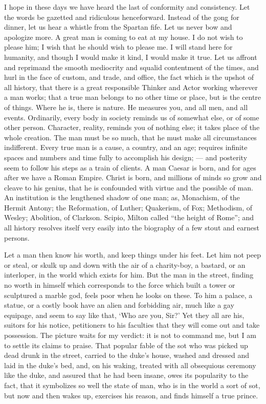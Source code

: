 \documentclass[12pt]{article}
\begin{document}
I hope in these days we have heard the last of conformity and consistency.
Let the words be gazetted and ridiculous henceforward. Instead of the gong
for dinner, let us hear a whistle from the Spartan fife. Let us never bow
and apologize more. A great man is coming to eat at my house. I do not wish
to please him; I wish that he should wish to please me. I will stand here
for humanity, and though I would make it kind, I would make it true. Let us
affront and reprimand the smooth mediocrity and squalid contentment of the
times, and hurl in the face of custom, and trade, and office, the fact which
is the upshot of all history, that there is a great responsible Thinker and
Actor working wherever a man works; that a true man belongs to no other time
or place, but is the centre of things. Where he is, there is nature. He
measures you, and all men, and all events. Ordinarily, every body in society
reminds us of somewhat else, or of some other person. Character, reality,
reminds you of nothing else; it takes place of the whole creation. The man
must be so much, that he must make all circumstances indifferent. Every true
man is a cause, a country, and an age; requires infinite spaces and numbers
and time fully to accomplish his design; --- and posterity seem to follow his
steps as a train of clients. A man Caesar is born, and for ages after we
have a Roman Empire. Christ is born, and millions of minds so grow and
cleave to his genius, that he is confounded with virtue and the possible of
man. An institution is the lengthened shadow of one man; as, Monachism, of
the Hermit Antony; the Reformation, of Luther; Quakerism, of Fox; Methodism,
of Wesley; Abolition, of Clarkson. Scipio, Milton called ``the height of
Rome''; and all history resolves itself very easily into the biography of a
few stout and earnest persons.

Let a man then know his worth, and keep things under his feet. Let him not
peep or steal, or skulk up and down with the air of a charity-boy, a
bastard, or an interloper, in the world which exists for him. But the man in
the street, finding no worth in himself which corresponds to the force which
built a tower or sculptured a marble god, feels poor when he looks on these.
To him a palace, a statue, or a costly book have an alien and forbidding
air, much like a gay equipage, and seem to say like that, `Who are you,
Sir?' Yet they all are his, suitors for his notice, petitioners to his
faculties that they will come out and take possession. The picture waits for
my verdict: it is not to command me, but I am to settle its claims to
praise. That popular fable of the sot who was picked up dead drunk in the
street, carried to the duke's house, washed and dressed and laid in the
duke's bed, and, on his waking, treated with all obsequious ceremony like
the duke, and assured that he had been insane, owes its popularity to the
fact, that it symbolizes so well the state of man, who is in the world a
sort of sot, but now and then wakes up, exercises his reason, and finds
himself a true prince.
\end{document}
